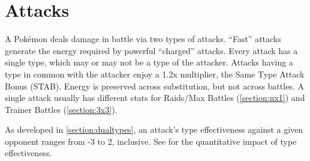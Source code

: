 \chapter{Attacks}
A Pokémon deals damage in battle via two types of attacks.
``Fast'' attacks generate the energy required by powerful ``charged'' attacks.
Every attack has a single type, which may or may not be a type of the attacker.
Attacks having a type in common with the attacker enjoy a 1.2x multiplier, the Same Type Attack Bonus (STAB).
Energy is preserved across substitution, but not across battles.
A single attack usually has different stats for Raids/Max Battles (\autoref{section:nx1})
  and Trainer Battles (\autoref{section:3x3}).

As developed in \autoref{section:dualtypes}, an attack's type effectiveness
 against a given opponent ranges from -3 to 2, inclusive.
See \label{table:typemult} for the quantitative impact of type effectiveness.

